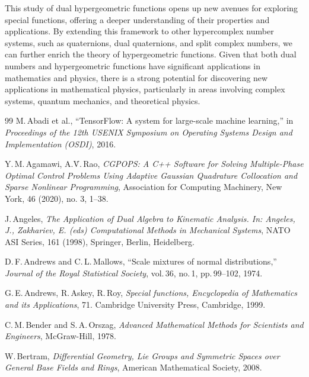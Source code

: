 \documentclass[11pt,a4paper,fleqn]{article}
\numberwithin{equation}{section}
\numberwithin{lemma}{section}
\numberwithin{theorem}{section}
\numberwithin{corollary}{section}
\begin{document}
This study of dual hypergeometric functions opens up new avenues for exploring special functions, offering a deeper understanding of their properties and applications. By extending this framework to other hypercomplex number systems, such as quaternions, dual quaternions, and split complex numbers, we can further enrich the theory of hypergeometric functions. Given that both dual numbers and hypergeometric functions have significant applications in mathematics and physics, there is a strong potential for discovering new applications in mathematical physics, particularly in areas involving complex systems, quantum mechanics, and theoretical physics.  
	\begin{thebibliography}{99}
 M.\,Abadi et al., “TensorFlow: A system for large-scale machine learning,” in \textit{Proceedings of the 12th USENIX Symposium on Operating Systems Design and Implementation (OSDI)}, 2016.

 {Y.\,M.\,Agamawi, A.\.V.\,Rao}, \textit{CGPOPS: A C++ Software for Solving Multiple-Phase Optimal Control Problems Using Adaptive Gaussian Quadrature Collocation and Sparse Nonlinear Programming}, Association for Computing Machinery, New York, 46 (2020), no. 3, 1--38.

 J.\,Angeles, \textit{The Application of Dual Algebra to Kinematic Analysis. In: Angeles, J., Zakhariev, E. (eds) Computational Methods in Mechanical Systems}, NATO ASI Series,  161 (1998), Springer, Berlin, Heidelberg.

 D.\,F.\,Andrews and C.\,L.\,Mallows, “Scale mixtures of normal distributions,” \textit{Journal of the Royal Statistical Society}, vol.\,36, no.\,1, pp.\,99--102, 1974.

 G.\,E.\,Andrews, R.\,Askey, R.\,Roy, \textit{Special functions, Encyclopedia of Mathematics and its Applications}, 71. Cambridge University Press, Cambridge, 1999.



 C.\,M.\,Bender and S.\,A.\,Orszag, \textit{Advanced Mathematical Methods for Scientists and Engineers}, McGraw-Hill, 1978.

 W.\,Bertram,  \textit{Differential Geometry, Lie Groups and Symmetric Spaces over General Base Fields and Rings}, American Mathematical Society, 2008.


\end{thebibliography}
\end{document}
